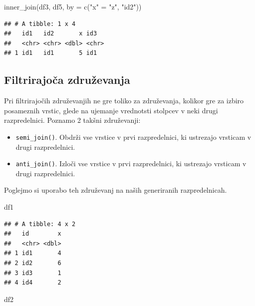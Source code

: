 \documentclass[
]{book}
\newenvironment{Shaded}{\begin{snugshade}}{\end{snugshade}}
\newcommand{\AttributeTok}[1]{\textcolor[rgb]{0.77,0.63,0.00}{#1}}
\newcommand{\FunctionTok}[1]{\textcolor[rgb]{0.00,0.00,0.00}{#1}}
\newcommand{\NormalTok}[1]{#1}
\newcommand{\OtherTok}[1]{\textcolor[rgb]{0.56,0.35,0.01}{#1}}
\newcommand{\StringTok}[1]{\textcolor[rgb]{0.31,0.60,0.02}{#1}}
\providecommand{\tightlist}{%
  \setlength{\itemsep}{0pt}\setlength{\parskip}{0pt}}
\begin{document}
\begin{Shaded}
\begin{Highlighting}[]
\FunctionTok{inner\_join}\NormalTok{(df3, df5, }\AttributeTok{by =} \FunctionTok{c}\NormalTok{(}\StringTok{"x"} \OtherTok{=} \StringTok{"z"}\NormalTok{, }\StringTok{"id2"}\NormalTok{))}
\end{Highlighting}
\end{Shaded}

\begin{verbatim}
## # A tibble: 1 x 4
##   id1   id2       x id3  
##   <chr> <chr> <dbl> <chr>
## 1 id1   id1       5 id1
\end{verbatim}

\hypertarget{filtrirajoux10da-zdruux17eevanja}{%
\subsection{Filtrirajoča združevanja}\label{filtrirajoux10da-zdruux17eevanja}}

Pri filtrirajočih združevanjih ne gre toliko za združevanja, kolikor gre za izbiro posameznih vrstic, glede na ujemanje vrednotsti stolpcev v neki drugi razpredelnici. Poznamo 2 takšni združevanji:

\begin{itemize}
\tightlist
\item
  \texttt{semi\_join()}. Obdrži vse vrstice v prvi razpredelnici, ki ustrezajo vrsticam v drugi razpredelnici.
\item
  \texttt{anti\_join()}. Izloči vse vrstice v prvi razpredelnici, ki ustrezajo vrsticam v drugi razpredelnici.
\end{itemize}

Poglejmo si uporabo teh združevanj na naših generiranih razpredelnicah.

\begin{Shaded}
\begin{Highlighting}[]
\NormalTok{df1}
\end{Highlighting}
\end{Shaded}

\begin{verbatim}
## # A tibble: 4 x 2
##   id        x
##   <chr> <dbl>
## 1 id1       4
## 2 id2       6
## 3 id3       1
## 4 id4       2
\end{verbatim}

\begin{Shaded}
\begin{Highlighting}[]
\NormalTok{df2}
\end{Highlighting}
\end{Shaded}
\end{document}
